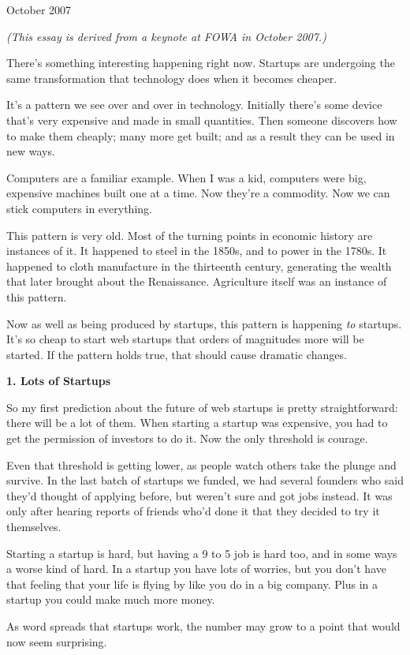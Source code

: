 \documentclass[12pt]{book}
\begin{document}
October 2007

\emph{(This essay is derived from a keynote at FOWA in October 2007.)}

There's something interesting happening right now. Startups are
undergoing the same transformation that technology does when it becomes
cheaper.

It's a pattern we see over and over in technology. Initially there's
some device that's very expensive and made in small quantities. Then
someone discovers how to make them cheaply; many more get built; and as
a result they can be used in new ways.

Computers are a familiar example. When I was a kid, computers were big,
expensive machines built one at a time. Now they're a commodity. Now we
can stick computers in everything.

This pattern is very old. Most of the turning points in economic history
are instances of it. It happened to steel in the 1850s, and to power in
the 1780s. It happened to cloth manufacture in the thirteenth century,
generating the wealth that later brought about the Renaissance.
Agriculture itself was an instance of this pattern.

Now as well as being produced by startups, this pattern is happening
\emph{to} startups. It's so cheap to start web startups that orders of
magnitudes more will be started. If the pattern holds true, that should
cause dramatic changes.

\textbf{1. Lots of Startups}

So my first prediction about the future of web startups is pretty
straightforward: there will be a lot of them. When starting a startup
was expensive, you had to get the permission of investors to do it. Now
the only threshold is courage.

Even that threshold is getting lower, as people watch others take the
plunge and survive. In the last batch of startups we funded, we had
several founders who said they'd thought of applying before, but weren't
sure and got jobs instead. It was only after hearing reports of friends
who'd done it that they decided to try it themselves.

Starting a startup is hard, but having a 9 to 5 job is hard too, and in
some ways a worse kind of hard. In a startup you have lots of worries,
but you don't have that feeling that your life is flying by like you do
in a big company. Plus in a startup you could make much more money.

As word spreads that startups work, the number may grow to a point that
would now seem surprising.
\end{document}
